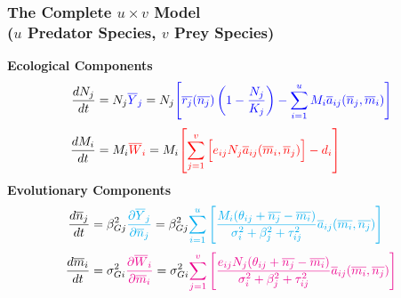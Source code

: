 \documentclass[10pt]{beamer}
\begin{document}
\begin{frame}
	\frametitle{The Complete $u\times v$ Model \\ ($u$ Predator Species, $v$ Prey Species)}
	{\bf Ecological Components}
	\begin{align*}
		\frac{dN_j}{dt} &= N_j{\color{blue}\overline{Y}_j} = N_j {\color{blue}\left[{\color{blue}\overline{r_j}(\overline{n_j})\left(1 - \frac{N_j}{K_j}\right) - \sum\limits_{i = 1}^{u}M_i\overline{a}_{ij}(\overline{n}_j, \overline{m}_i)}\right]} \\[.1cm]
		\frac{dM_i}{dt} &= M_i{\color{red}\overline{W}_i} = M_i {\color{red}\left[\sum\limits_{j = 1}^{v}\Big[e_{ij}N_j\overline{a}_{ij}(\overline{m}_i, \overline{n}_j)\Big] - d_i\right]}
	\end{align*}
	{\bf Evolutionary Components}
	\begin{align*}
		\frac{d\overline{n}_j}{dt} &= \beta_{Gj}^2{\color{cyan}\frac{\partial \overline{Y}_j}{\partial \overline{n}_j}} = \beta_{Gj}^2{\color{cyan}\sum\limits_{i=1}^{u}\left[\frac{M_i(\theta_{ij} + \overline{n_j} - \overline{m_i})}{\sigma_i^2 + \beta_j^2 + \tau_{ij}^2} \overline{a}_{ij}(\overline{m_i}, \overline{n_j})\right]}\\[.1cm]
		\frac{d\overline{m}_i}{dt} &= \sigma_{Gi}^2{\color{magenta}\frac{\partial \overline{W}_i}{\partial \overline{m}_i}} = \sigma_{Gi}^2{\color{magenta}\sum\limits_{j=1}^{v}\left[\frac{e_{ij}N_j(\theta_{ij} + \overline{n_j} - \overline{m_i})}{\sigma_i^2 + \beta_j^2 + \tau_{ij}^2} \overline{a}_{ij}(\overline{m_i}, \overline{n_j})\right]}
	\end{align*}
\end{frame}
\end{document}

